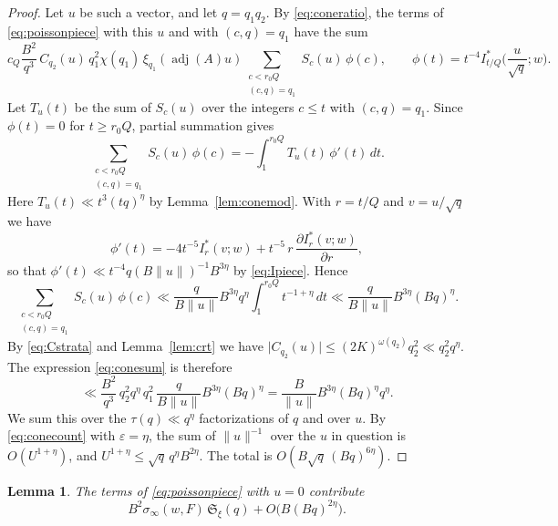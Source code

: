 \documentclass[11pt]{amsart}
\numberwithin{equation}{section}
\numberwithin{figure}{section}
\newtheorem{lemma}{Lemma}[section]
\theoremstyle{definition}
\renewcommand{\S}{\mathfrak{S}}
\newcommand{\eps}{\varepsilon}
\newcommand{\abs}[1]{\lvert #1\rvert}
\newcommand{\adj}{\operatorname{adj}}
\begin{document}
\begin{proof}
Let $u$ be such a vector, and let $q=q_1q_2$. By
\eqref{eq:coneratio}, the terms of \eqref{eq:poissonpiece} with this
$u$ and with $(c,q)=q_1$ have the sum
\begin{equation}\label{eq:conesum}
 c_Q\frac{B^2}{q^3}\,C_{q_2}(u)\,q_1^2\chi(q_1)\,\xi_{q_1}(\adj(A)u)
 \sum_{\substack{c<r_0Q\\(c,q)=q_1}}S_c(u)\,\phi(c),
 \qquad\phi(t)=t^{-4}I_{t/Q}^*\Big(\frac u{\sqrt q};w\Big).
\end{equation}
Let $T_u(t)$ be the sum of $S_c(u)$ over the integers $c\le t$ with
$(c,q)=q_1$. Since $\phi(t)=0$ for $t\ge r_0Q$, partial summation
gives
\[
 \sum_{\substack{c<r_0Q\\(c,q)=q_1}}S_c(u)\,\phi(c)
 =-\int_1^{r_0Q}T_u(t)\,\phi'(t)\,dt.
\]
Here $T_u(t)\ll t^3(tq)^\eta$ by Lemma~\ref{lem:conemod}. With
$r=t/Q$ and $v=u/\sqrt q$ we have
\[
 \phi'(t)=-4t^{-5}I_r^*(v;w)
 +t^{-5}\,r\,\frac{\partial I_r^*(v;w)}{\partial r},
\]
so that $\phi'(t)\ll t^{-4}q(B\lVert u\rVert)^{-1}B^{3\eta}$ by
\eqref{eq:Ipiece}. Hence
\[
 \sum_{\substack{c<r_0Q\\(c,q)=q_1}}S_c(u)\,\phi(c)
 \ll\frac q{B\lVert u\rVert}B^{3\eta}q^\eta\int_1^{r_0Q}t^{-1+\eta}\,dt
 \ll\frac q{B\lVert u\rVert}B^{3\eta}(Bq)^\eta.
\]
By \eqref{eq:Cstrata} and Lemma~\ref{lem:crt} we have
$\abs{C_{q_2}(u)}\le(2K)^{\omega(q_2)}q_2^2\ll q_2^2q^\eta$. The
expression \eqref{eq:conesum} is therefore
\[
 \ll\frac{B^2}{q^3}\,q_2^2q^\eta\,q_1^2\,
 \frac q{B\lVert u\rVert}B^{3\eta}(Bq)^\eta
 =\frac B{\lVert u\rVert}B^{3\eta}(Bq)^\eta q^\eta.
\]
We sum this over the $\tau(q)\ll q^\eta$ factorizations of $q$ and
over $u$. By \eqref{eq:conecount} with $\eps=\eta$, the sum of
$\lVert u\rVert^{-1}$ over the $u$ in question is
$O(U^{1+\eta})$, and $U^{1+\eta}\le\sqrt q\,q^\eta B^{2\eta}$. The
total is $O(B\sqrt q\,(Bq)^{6\eta})$.
\end{proof}

\begin{lemma}\label{lem:zerofreq}
The terms of \eqref{eq:poissonpiece} with $u=0$ contribute
\[
 B^2\sigma_\infty(w,F)\,\S_\xi(q)+O\big(B(Bq)^{2\eta}\big).
\]
\end{lemma}
\end{document}
